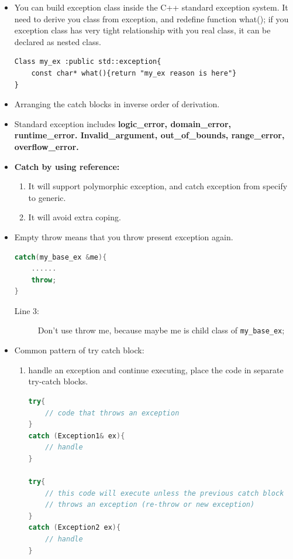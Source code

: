 \documentclass[a4paper,11pt,twoside]{book}
\begin{document}
\begin{itemize}
	\item You can build exception class inside the C++ standard exception system. It need to derive you class from exception, and redefine function what();  if you exception class has very tight relationship with you real class, it can be declared as nested class.
	
\begin{lstlisting}[numbers=none]
Class my_ex :public std::exception{
	const char* what(){return "my_ex reason is here"}
}
\end{lstlisting}
	
	\item Arranging the catch blocks in inverse order of derivation.
	
	\item Standard exception includes \textbf{logic\_error, domain\_error,  runtime\_error.  Invalid\_argument, out\_of\_bounds, range\_error, overflow\_error.}
	
	\item \textbf{Catch by using reference:}
	\begin{enumerate}
		\item It will support polymorphic exception, and catch exception from specify to generic.
		\item It will avoid extra coping.
	\end{enumerate}
	
\item Empty throw means that you throw present exception again.
\begin{lstlisting}[frame=single, language=c++]
catch(my_base_ex &me){
	......
	throw;
}
\end{lstlisting}
\begin{description}
	\item[Line 3:] Don't use throw me, because maybe me is child class of \texttt{my\_base\_ex};
\end{description}

\item Common pattern of try catch block:
\begin{enumerate}
	 \item handle an exception and continue executing, place the code in separate try-catch blocks. 

\begin{lstlisting}[frame=single, language=c++]
try{ 
	// code that throws an exception	
}
catch (Exception1& ex){
	// handle
}

try{ 
	// this code will execute unless the previous catch block 
	// throws an exception (re-throw or new exception) 
}
catch (Exception2 ex){
	// handle
}		
\end{lstlisting}


\end{enumerate}
\end{itemize}
\end{document}
